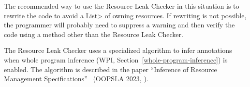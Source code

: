 The recommended way to use the Resource Leak Checker in this situation is
to rewrite the code to avoid a \<List> of owning resources. If rewriting is
not possible, the programmer will probably need to suppress a warning and
then verify the code using a method other than the Resource Leak Checker.



The Resource Leak Checker uses a specialized algorithm to infer annotations
when whole program inference (WPI, Section~\ref{whole-program-inference})
is enabled.  The algorithm is described in the paper ``Inference of
Resource Management Specifications''~\cite{ShadabGTEKLLS2023} (OOPSLA 2023,
).


